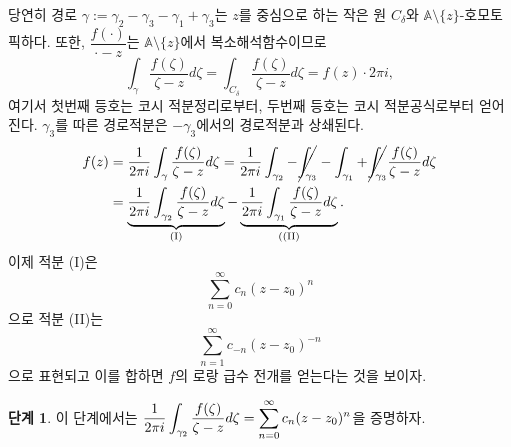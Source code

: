 당연히
경로 $\gamma := \gamma_2 - \gamma_3 - \gamma_1 + \gamma_3$는
$z$를 중심으로 하는 작은 원 $C_\delta$와 $\mathbb A\setminus \{z\}$-호모토픽하다.
또한, $\dfrac{f(\cdot)}{\cdot-z}$는 $\mathbb A\setminus \{z\}$에서
복소해석함수이므로
\[
\int_\gamma \dfrac{f(\zeta)}{\zeta-z} d\zeta
= \int_{C_\delta} \dfrac{f(\zeta)}{\zeta-z} d\zeta
= f(z) \cdot 2\pi i,
\]
여기서 첫번째 등호는 코시 적분정리로부터,
두번째 등호는 코시 적분공식로부터 얻어진다.
$\gamma_3$를 따른 경로적분은 $-\gamma_3$에서의 경로적분과 상쇄된다.
\begin{align*}
f(z) &= \dfrac1{2\pi i} \int_\gamma \dfrac{f(\zeta)}{\zeta-z}d\zeta
= \dfrac1{2\pi i} \int_{\gamma_2} - \cancel{ \int_{\gamma_3}}
-  \int_{\gamma_1} + \cancel{\int_{\gamma_3 }}\dfrac{f(\zeta)}{\zeta-z}d\zeta \\
&= \underbrace{\dfrac1{2\pi i} \int_{\gamma_2} \dfrac{f(\zeta)}{\zeta-z}d\zeta}_{\text{(I)}}
- \underbrace{\dfrac1{2\pi i} \int_{\gamma_1} \dfrac{f(\zeta)}{\zeta-z}d\zeta}_{(\text{(II)}}.
\end{align*}
이제 적분 (I)은
\[
\sum_{n=0}^\infty c_n(z-z_0)^n
\]
으로 적분 (II)는 
\[
\sum_{n=1}^\infty c_{-n}(z-z_0)^{-n}
\]
으로 표현되고 이를 합하면 $f$의 로랑 급수 전개를 얻는다는 것을 보이자.

{\bf 단계 1}.
이 단계에서는 $\dfrac1{2\pi i} \dint_{\gamma_2} \dfrac{f(\zeta)}{\zeta-z}d\zeta
= \Sum_{n=0}^\infty c_n(z-z_0)^n$을 증명하자.

